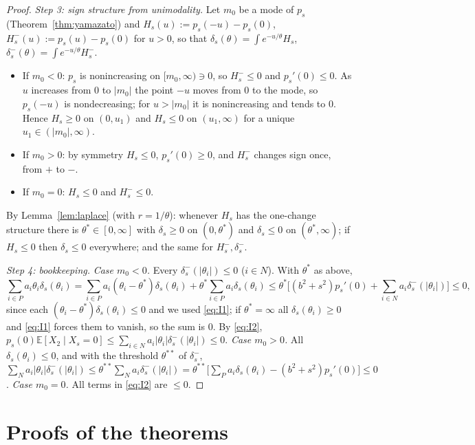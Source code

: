 \documentclass[11pt]{article}
\theoremstyle{remark}
\newcommand{\E}{\mathbb{E}}
\begin{document}
\begin{proof}
\emph{Step 3: sign structure from unimodality.} Let $m_0$ be a mode of $p_s$ (Theorem~\ref{thm:yamazato}) and
$H_s(u):=p_s(-u)-p_s(0)$, $H_s^-(u):=p_s(u)-p_s(0)$ for $u>0$, so that $\delta_s(\theta)=\int e^{-u/\theta}H_s$, $\delta_s^-(\theta)=\int e^{-u/\theta}H_s^-$.
\begin{itemize}
\item If $m_0<0$: $p_s$ is nonincreasing on $[m_0,\infty)\ni0$, so $H_s^-\le0$ and $p_s'(0)\le0$. As $u$ increases from $0$ to $|m_0|$ the point $-u$
moves from $0$ to the mode, so $p_s(-u)$ is nondecreasing; for $u>|m_0|$ it is nonincreasing and tends to $0$. Hence $H_s\ge0$ on $(0,u_1)$ and
$H_s\le0$ on $(u_1,\infty)$ for a unique $u_1\in(|m_0|,\infty)$.
\item If $m_0>0$: by symmetry $H_s\le0$, $p_s'(0)\ge0$, and $H_s^-$ changes sign once, from $+$ to $-$.
\item If $m_0=0$: $H_s\le0$ and $H_s^-\le0$.
\end{itemize}
By Lemma~\ref{lem:laplace} (with $r=1/\theta$): whenever $H_s$ has the one-change structure there is $\theta^*\in[0,\infty]$ with
$\delta_s\ge0$ on $(0,\theta^*)$ and $\delta_s\le0$ on $(\theta^*,\infty)$; if $H_s\le0$ then $\delta_s\le0$ everywhere; and the same for $H_s^-,\delta_s^-$.

\emph{Step 4: bookkeeping.} \emph{Case $m_0<0$.} Every $\delta_s^-(|\theta_i|)\le0$ ($i\in N$). With $\theta^*$ as above,
\[
\sum_{i\in P}a_i\theta_i\delta_s(\theta_i)=\sum_{i\in P}a_i(\theta_i-\theta^*)\delta_s(\theta_i)+\theta^*\sum_{i\in P}a_i\delta_s(\theta_i)
\le\theta^*\Big[(b^2+s^2)p_s'(0)+\sum_{i\in N}a_i\delta_s^-(|\theta_i|)\Big]\le0,
\]
since each $(\theta_i-\theta^*)\delta_s(\theta_i)\le0$ and we used \eqref{eq:I1}; if $\theta^*=\infty$ all $\delta_s(\theta_i)\ge0$ and
\eqref{eq:I1} forces them to vanish, so the sum is $0$. By \eqref{eq:I2}, $p_s(0)\E[X_2\mid X_s=0]\le\sum_{i\in N}a_i|\theta_i|\delta_s^-(|\theta_i|)\le0$.
\emph{Case $m_0>0$.} All $\delta_s(\theta_i)\le0$, and with the threshold $\theta^{**}$ of $\delta_s^-$,
$\sum_{N}a_i|\theta_i|\delta_s^-(|\theta_i|)\le\theta^{**}\sum_Na_i\delta_s^-(|\theta_i|)=\theta^{**}\big[\sum_Pa_i\delta_s(\theta_i)-(b^2+s^2)p_s'(0)\big]\le0$.
\emph{Case $m_0=0$.} All terms in \eqref{eq:I2} are $\le0$.
\end{proof}

\section{Proofs of the theorems}
\end{document}
